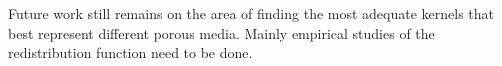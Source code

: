 \documentclass{CFD2011}
\begin{document}
Future work still remains on the area of finding the most adequate kernels that best represent different porous media. Mainly empirical studies of the redistribution function need to be done.

%
%
%
%
%
%
%
%
%
%
%
%
\end{document}
